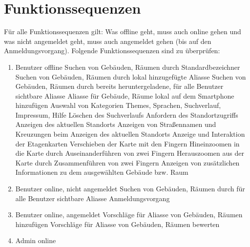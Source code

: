 \section{Funktionssequenzen}

Für alle Funktionssequenzen gilt: Was offline geht, muss auch online gehen und was nicht angemeldet geht, muss auch angemeldet gehen (bis auf den Anmeldungsvorgang).
Folgende Funktionssequenzen sind zu überprüfen:

\begin{enumerate}[label=\textbf{/T\arabic*0/}, align=left]
	\item{Benutzer offline}
	\subitem Suchen von Gebäuden, Räumen durch Standardbezeichner
	\subitem Suchen von Gebäuden, Räumen durch lokal hinzugefügte Aliasse
	\subitem Suchen von Gebäuden, Räumen durch bereits heruntergeladene, für alle Benutzer sichtbare Aliasse
	\subitem Aliasse für Gebäude, Räume lokal auf dem Smartphone hinzufügen
	\subitem Auswahl von Kategorien Themes, Sprachen, Suchverlauf, Impressum, Hilfe
	\subitem Löschen des Suchverlaufs
	\subitem Anfordern des Standortzugriffs
	\subitem Anzeigen des aktuellen Standorts
	\subitem Anzeigen von Straßennamen und Kreuzungen beim Anzeigen des aktuellen Standorts
	\subitem Anzeige und Interaktion der Etagenkarten
	\subitem Verschieben der Karte mit den Fingern
	\subitem Hineinzoomen in die Karte durch Auseinanderführen von zwei Fingern
	\subitem Herauszoomen aus der Karte durch Zusammenführen von zwei Fingern
	\subitem Anzeigen von zusätzlichen Informationen zu dem ausgewählten Gebäude bzw. Raum
	\item{Benutzer online, nicht angemeldet}
	\subitem Suchen von Gebäuden, Räumen durch für alle Benutzer sichtbare Aliasse
	\subitem Anmeldungsvorgang
	\item{Benutzer online, angemeldet}
	\subitem Vorschläge für Aliasse von Gebäuden, Räumen hinzufügen
	\subitem Vorschläge für Aliasse von Gebäuden, Räumen bewerten
	
	\item{Admin online}
	
\end{enumerate}